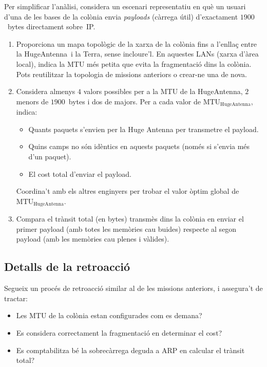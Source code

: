 \noindent
Per simplificar l'anàlisi, considera un escenari representatiu en què un usuari d'una de les bases de la colònia envia
\textit{payloads} (càrrega útil) d'exactament $1900$~bytes directament sobre~IP.

\begin{enumerate}[itemsep=0.1cm]
\item Proporciona un mapa topològic de la xarxa de la colònia fins a l'enllaç entre la HugeAntenna\texttrademark\  i la Terra, sense incloure'l. En aquestes LANs (xarxa d'àrea local), indica la MTU més petita que evita la fragmentació dins la colònia.
Pots reutilitzar la topologia de missions anteriors o crear-ne una de nova.

\item Considera almenys $4$ valors possibles per a la MTU de la HugeAntenna, $2$ menors de $1900$~bytes i dos de majors. Per a cada valor de $\textrm{MTU}_\textrm{HugeAntenna}$, indica:
  \begin{itemize}
  \item Quants paquets s'envien per la Huge Antenna per transmetre el payload.
  \item Quins camps no són idèntics en aquests paquets (només si s'envia més d'un paquet).
  \item El cost total d'enviar el payload.
  \end{itemize}
Coordina't amb els altres enginyers per trobar el valor òptim global de $\textrm{MTU}_\textrm{HugeAntenna}$.

\item Compara el trànsit total (en bytes) transmès dins la colònia en enviar el primer payload (amb totes les memòries cau buides) respecte al segon payload (amb les memòries cau plenes i vàlides).
\end{enumerate}


\subsection*{Detalls de la retroacció}

Segueix un procés de retroacció similar al de les missions anteriors, i assegura't de tractar:
\begin{itemize}
\item Les MTU de la colònia estan configurades com es demana?
\item Es considera correctament la fragmentació en determinar el cost?
\item Es comptabilitza bé la sobrecàrrega deguda a ARP en calcular el trànsit total?
\end{itemize}
